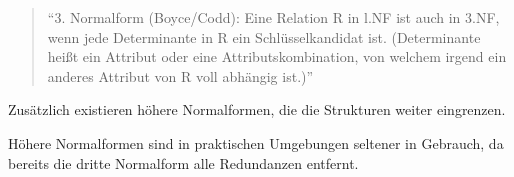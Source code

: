 \begin{quote}
"`3. Normalform (Boyce/Codd): Eine Relation R in l.NF ist auch in 3.NF, wenn jede Determinante in R ein Schlüsselkandidat ist. (Determinante heißt ein Attribut oder eine Attributskombination, von  welchem irgend ein anderes Attribut von R voll abhängig ist.)"' \cite[Seite 52]{Zehnder.1985}
\end{quote}




Zusätzlich existieren höhere Normalformen, die die Strukturen weiter eingrenzen.

Höhere Normalformen sind in praktischen Umgebungen seltener in Gebrauch, da bereits die dritte Normalform alle Redundanzen entfernt. \cite{Zehnder.1985}












